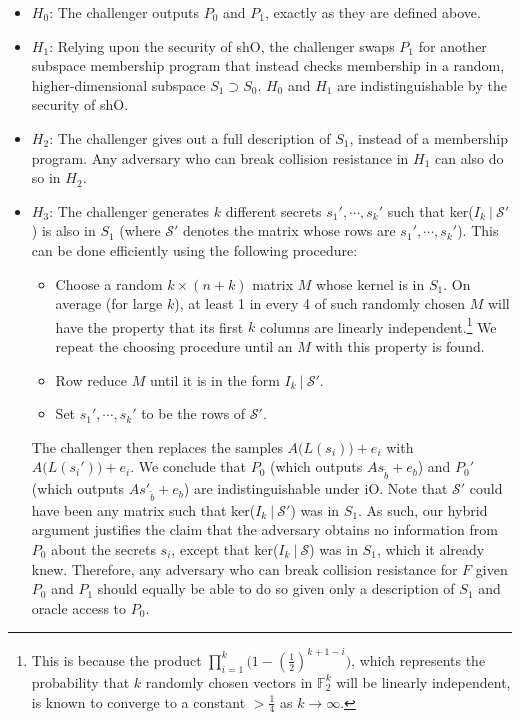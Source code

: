 \documentclass{article}
\begin{document}
\begin{itemize}
    \item $H_0$: The challenger outputs $P_0$ and $P_1$, exactly as they are defined above.
    \item $H_1$: Relying upon the security of \textsf{shO}, the challenger swaps $P_1$ for another subspace membership program that instead checks membership in a random, higher-dimensional subspace $S_1 \supset S_0$. $H_0$ and $H_1$ are indistinguishable by the security of \textsf{shO}.
    \item $H_2$: The challenger gives out a full description of $S_1$, instead of a membership program. Any adversary who can break collision resistance in $H_1$ can also do so in $H_2$.
    \item $H_3$: The challenger generates $k$ different secrets $s_1', \cdots, s_k'$ such that ker($I_k \: | \: \mathcal{S}'$) is also in $S_1$ (where $\mathcal{S}'$ denotes the matrix whose rows are $s_1', \cdots, s_k'$). This can be done efficiently using the following procedure:
    \begin{itemize}
        \item Choose a random $k \times (n+k)$ matrix $M$ whose kernel is in $S_1$. On average (for large $k$), at least 1 in every 4 of such randomly chosen $M$ will have the property that its first $k$ columns are linearly independent.\footnote{This is because the product $\prod_{i=1}^k \big(1-(\frac{1}{2})^{k+1-i}\big)$, which represents the probability that $k$ randomly chosen vectors in $\mathbb{F}_2^k$ will be linearly independent, is known to converge to a constant $ > \frac{1}{4}$ as $k \rightarrow \infty$.} We repeat the choosing procedure until an $M$ with this property is found.
        \item Row reduce $M$ until it is in the form $I_k \: | \: \mathcal{S}'$.
        \item Set $s_1', \cdots, s_k'$ to be the rows of $\mathcal{S}'$.
    \end{itemize}
    
    The challenger then replaces the samples $A\big( L(s_i) \big) + e_i$ with $A\big( L(s_i') \big) + e_i$.
    We conclude that $P_0$ (which outputs $As_{\widetilde{b}} + e_{b}$) and $P_0'$ (which outputs $As'_{\widetilde{b}} + e_{b}$) are indistinguishable under \textsf{iO}. Note that $\mathcal{S}'$ could have been any matrix such that ker($I_k \: | \: \mathcal{S}'$) was in $S_1$. As such, our hybrid argument justifies the claim that the adversary obtains no information from $P_0$ about the secrets $s_i$, except that ker($I_k \: | \: \mathcal{S}$) was in $S_1$, which it already knew. Therefore, any adversary who can break collision resistance for $F$ given $P_0$ and $P_1$ should equally be able to do so given only a description of $S_1$ and oracle access to $P_0$.


\end{itemize}
\end{document}
